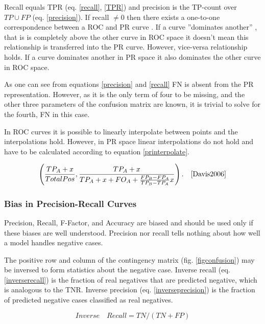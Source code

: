 \documentclass[english,12pt,a4paper,pdftex,elec,utf8, table]{aaltothesis}
\begin{document}
Recall equals TPR (eq. \ref{recall}, \ref{TPR}) and precision is the TP-count over $TP \cup FP$ (eq. \ref{precision}). If recall $\neq 0$ then there exists a one-to-one correspondence between a ROC and PR curve \cite{Davis2006}. If a curve ''dominates another'' \cite{Provost1997}, that is is completely above the other curve in ROC space it doesn't mean this relationship is transferred into the PR curve. However, vice-versa relationship holds. If a curve dominates another in PR space it also dominates the other curve in ROC space. \cite{Davis2006}

As one can see from equations \ref{precision} and \ref{recall} FN is absent from the PR representation. However, as it is the only term of four to be missing, and the other three parameters of the confusion matrix are known, it is trivial to solve for the fourth, FN in this case. \cite{Davis2006}

In ROC curves it is possible to linearly interpolate between points and the interpolations hold. However, in PR space linear interpolations do not hold and have to be calculated according to equation \ref{printerpolate}. \cite{Davis2006}

\begin{equation}\label{printerpolate}
\left(\frac{TP_A+x}{Total Pos}, \frac{TP_A+x}{TP_A+x+FO_A+ \frac{FP_B-FP_A}{TP_B-TP_A}x} \right). \quad \cite{Davis2006}
\end{equation}

\subsubsection{Bias in Precision-Recall Curves}
Precision, Recall, F-Factor, and Accuracy are biased and should be used only if these biases are well understood. Precision nor recall tells nothing about how well a model handles negative cases. \cite{POWERS2011}

The positive row and column of the contingency matrix (fig. \ref{figconfusion}) may be inversed to form statistics about the negative case. Inverse recall (eq. \ref{inverserecall}) is the fraction of real negatives that are predicted negative, which is analogous to the TNR. Inverse precision (eq. \ref{inverseprecision}) is the fraction of predicted negative cases classified as real negatives. \cite{POWERS2011}

\begin{equation}\label{inverserecall}
Inverse\quad Recall = TN / (TN + FP)
\end{equation}
\end{document}
